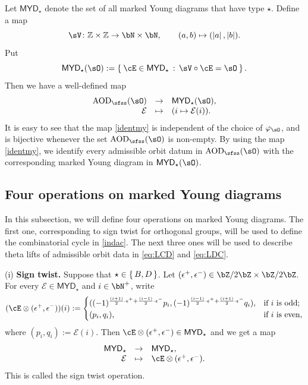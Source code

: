 \documentclass[11pt,a4paper]{amsart}
\def\MYD{{\mathsf{MYD}}}
\def\abs#1{\left|{#1}\right|}
\newcommand{\CE}{{\mathcal {E}}}
\newcommand{\Z}{\mathbb{Z}}
\newcommand{\be}{\begin {equation}}
\newcommand{\ee}{\end {equation}}
\numberwithin{equation}{section}
\theoremstyle{remark}
\def\MYD{{\mathsf{MYD}}}
\def\AOD{\mathrm{AOD}}
\def\lotimes{\otimes}
\begin{document}
Let $\MYD_{\star}$ denote the set of all marked Young diagrams that have type $\star$. Define a map
\begin{equation}\label{eq:F1}
\sV\colon \Z\times \Z\rightarrow \bN\times \bN,\qquad (a,b)\mapsto (\abs{a},\abs{b}).
\end{equation}
Put
\[
  \MYD_\star(\sO) := \Set{\cE\in \MYD_\star  \,:\, \sV\circ \cE=\sO }.
\]
Then we have a well-defined map
\be\label{identmy}
\begin{array}{rcl}
\AOD_{\sfss}(\sO) & \rightarrow & \MYD_\star(\sO),\\
    \CE&\mapsto&(i\mapsto \CE(i)).
    \end{array}
\ee
It is easy to see that the map \eqref{identmy} is independent of the choice of $\varphi_\sO$, and is bijective whenever the set $\AOD_{\sfss}(\sO)$ is non-empty. By using the map \eqref{identmy}, we identify every admissible orbit datum in $\AOD_{\sfss}(\sO)$ with the corresponding marked Young diagram in $\MYD_\star(\sO)$.


\subsection{Four operations on marked Young diagrams}\label{fouro}


In this subsection, we will define four operations on marked Young diagrams. The first one, corresponding to sign twist for orthogonal groups, will be used to define the combinatorial cycle in \eqref{indac}. The next three ones will be used to describe theta lifts of admissible orbit data in \eqref{eq:LCD} and \eqref{eq:LDC}.

\smallskip



(i) {\bf  Sign twist.}
Suppose that $\star\in \set{B,D}$. Let $(\epsilon^{+},\epsilon^{-})\in \bZ/2\bZ\times \bZ/2\bZ$. For every $\CE\in \MYD_{\star}$  and $i\in \bN^+$, write
\[
(\cE \lotimes(\epsilon^{+},\epsilon^{-}))(i) := \begin{cases}
  ( (-1)^{\frac{(i+1)}{2}\cdot \epsilon^{+} +\frac{(i-1)}{2}\cdot \epsilon^{-}}p_{i},(-1)^{\frac{(i-1)}{2}\cdot \epsilon^{+} +\frac{(i+1)}{2}\cdot \epsilon^{-}} q_{i}),
  & \text{if $i$  is odd;}\\
  ( p_{i},q_{i}), & \text{if $i$  is even,}
\end{cases}
\]
where $( p_{i},q_{i}):=\CE(i)$. Then $\cE \lotimes(\epsilon^{+},\epsilon^{-})\in \MYD_{\star}$ and we get a  map
\be\label{stwist}
\begin{array}{rcl}
  \MYD_{\star}&\rightarrow&\MYD_{\star}, \\
   \CE&\mapsto &\cE \lotimes(\epsilon^{+},\epsilon^{-}).
   \end{array}
\ee
This is called the sign twist operation.
\end{document}
